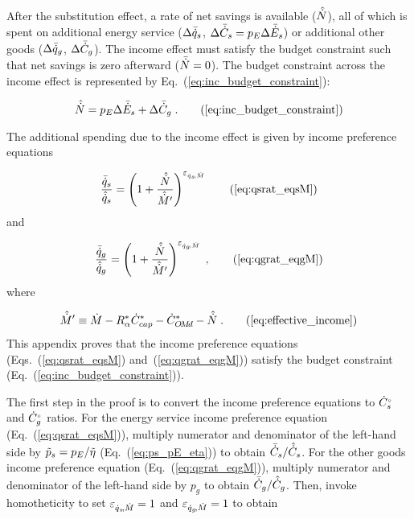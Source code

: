 

After the substitution effect, 
a rate of net savings is available ($\hat{\dot{N}}$), 
all of which is spent on
additional energy service ($\Delta \bar{\dot{q}}_s$, $\Delta \bar{\dot{C}}_s = p_E \Delta \bar{\dot{E}}_s$) or 
additional other goods ($\Delta \bar{\dot{q}}_g$, $\Delta \bar{\dot{C}}_g$).
The income effect must satisfy the budget constraint
such that net savings is zero afterward ($\bar{\dot{N}} = 0$).
The budget constraint across the income effect 
is represented by Eq.~(\ref{eq:inc_budget_constraint}): 

\begin{equation}
  \rbinc{N} = p_E \Delta \rainc{E}_s + \Delta \rainc{C}_g \; . \tag{\ref{eq:inc_budget_constraint}}
\end{equation}

The additional spending due to the income effect is given by income preference equations

\begin{equation}
  \frac{\rainc{q}_s}{\rbinc{q}_s} = \left( 1 + \frac{\rbinc{N}}{\Mdothatprime}  \right) ^{\eqsM} 
                                                                \tag{\ref{eq:qsrat_eqsM}}
\end{equation}
%
and

\begin{equation}
  \frac{\rainc{q}_g}{\rbinc{q}_g} = \left( 1 + \frac{\rbinc{N}}{\Mdothatprime}  \right) ^{\eqgM} \; ,
                                                                \tag{\ref{eq:qgrat_eqgM}}
\end{equation}
%
where

\begin{equation}
  \effinceqn \; . \tag{\ref{eq:effective_income}}
\end{equation}
%
This appendix proves that the income preference equations 
(Eqs.~(\ref{eq:qsrat_eqsM}) and~(\ref{eq:qgrat_eqgM}))
satisfy the budget constraint (Eq.~(\ref{eq:inc_budget_constraint})).

The first step in the proof is to convert 
the income preference equations
to ${}{\dot{C}}^{\scriptscriptstyle \circ}_s$ and ${}{\dot{C}}^{\scriptscriptstyle \circ}_g$ ratios.
For the energy service income preference equation (Eq.~(\ref{eq:qsrat_eqsM})), 
multiply numerator and denominator of the left-hand side by $\tilde{p}_s = p_E / \tilde{\eta}$
(Eq.~(\ref{eq:ps_pE_eta}))
to obtain $\bar{\dot{C}}_s / \hat{\dot{C}}_s$.
For the other goods income preference equation (Eq.~(\ref{eq:qgrat_eqgM})), 
multiply numerator and denominator of the left-hand side by $p_g$
to obtain $\bar{\dot{C}}_g / \hat{\dot{C}}_g$.
Then, invoke homotheticity to set $\varepsilon_{\dot{q}_s\!,\dot{M}} = 1$ and $\varepsilon_{\dot{q}_g\!,\dot{M}} = 1$ to obtain

